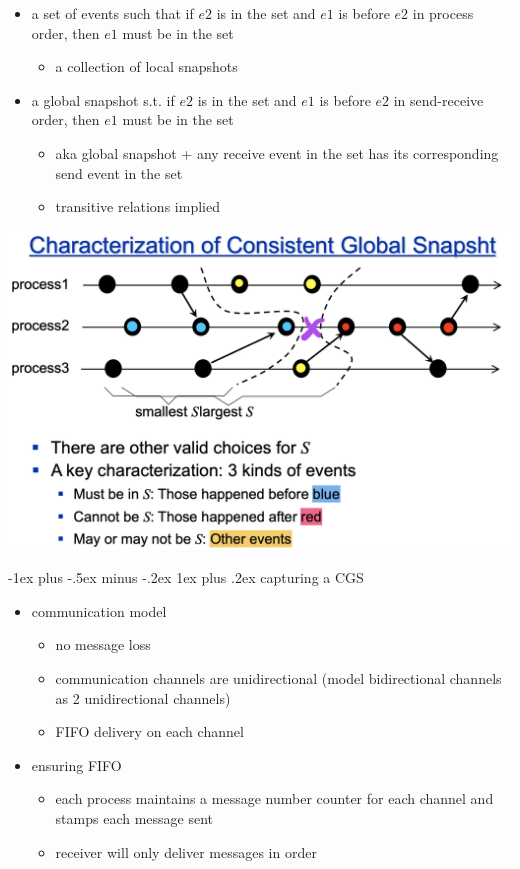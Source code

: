 \documentclass[10pt, landscape]{article}
\makeatletter
\renewcommand{\subsubsection}{\@startsection{subsubsection}{3}{0mm}%
  {-1ex plus -.5ex minus -.2ex}%
  {1ex plus .2ex}%
{\normalfont\small\bfseries}}%
\makeatother
\begin{document}
\begin{multicols*}{3}
  \begin{itemize}
    \item {} a set of events such that if $e2$ is in the set and $e1$ is before $e2$ in process order, then $e1$ must be in the set
      \begin{itemize}
        \item a collection of local snapshots
      \end{itemize}
    \item {} a global snapshot s.t. if $e2$ is in the set and $e1$ is before $e2$ in send-receive order, then $e1$ must be in the set
      \begin{itemize}
        \item aka global snapshot + any receive event in the set has its corresponding send event in the set 
        \item transitive relations implied
      \end{itemize}
  \end{itemize}
  \begin{tightcenter}
    \includegraphics[width=0.6\linewidth]{cs4231-consistent-global-snapshot.png} 
  \end{tightcenter}

  \subsubsection{capturing a CGS}

  \begin{itemize}
    \item communication model
      \begin{itemize}
        \item no message loss
        \item communication channels are unidirectional (model bidirectional channels as 2 unidirectional channels)
        \item FIFO delivery on each channel
      \end{itemize}
    \item ensuring FIFO
      \begin{itemize}
        \item each process maintains a message number counter for each channel and stamps each message sent
        \item receiver will only deliver messages in order
      \end{itemize}
  \end{itemize}


\end{multicols*}
\end{document}
